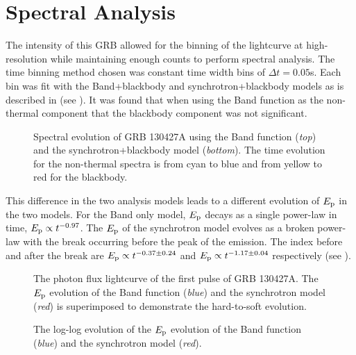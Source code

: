 \section{Spectral Analysis}
The intensity of this GRB allowed for the binning of the lightcurve at
high-resolution while maintaining enough counts to perform spectral
analysis. The time binning method chosen was constant time width bins
of $\Delta t=0.05$s. Each bin was fit with the Band+blackbody and
synchrotron+blackbody models as is described in  (see
). It was found that when using the Band
function as the non-thermal component that the blackbody component was
not significant.
\begin{figure}[t]
  \centering
\caption{Spectral evolution of GRB 130427A using the Band function
  (\emph{top}) and the synchrotron+blackbody model
  (\emph{bottom}). The time evolution for the non-thermal spectra is
  from cyan to blue and from yellow to red for the blackbody.}
  \label{fig:specEvo130427A}
\end{figure}
This difference in the two analysis models leads to a different
evolution of $E_{\rm p}$ in the two models. For the Band only model, $E_{\rm p}$
decays as a single power-law in time, $E_{\rm p} \propto t^{-0.97}$. The
$E_{\rm p}$ of the synchrotron model evolves as a broken power-law with the
break occurring before the peak of the emission. The index before and
after the break are $E_{\rm p} \propto t^{-0.37\pm0.24}$ and $E_{\rm p} \propto
t^{-1.17\pm0.04}$ respectively (see ).
\begin{figure}[t]
  \centering
  \caption{The photon flux lightcurve of the first pulse of GRB
    130427A. The $E_{\rm p}$ evolution of the Band function (\emph{blue})
    and the synchrotron model (\emph{red}) is superimposed to
    demonstrate the hard-to-soft evolution.}
  \label{fig:lightcurve130427A}
\end{figure}
\begin{figure}[t]
  \centering
  \caption{The log-log evolution of the $E_{\rm p}$ evolution of the Band
    function (\emph{blue}) and the synchrotron model (\emph{red}).}
  \label{fig:epevo130427A}
\end{figure}
